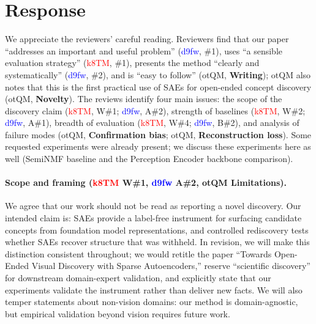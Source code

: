 \documentclass[10pt,twocolumn,letterpaper]{article}
\newcommand{\kTM}{\textcolor{red}{k8TM}}
\newcommand{\dfw}{\textcolor{blue}{d9fw}}
\newcommand{\otQM}{\textcolor{reviewgreen}{otQM}}
\begin{document}
\thispagestyle{empty}
\appendix


\section*{Response}

We appreciate the reviewers' careful reading.
Reviewers find that our paper ``addresses an important and useful problem'' (\dfw{}, \#1), uses ``a sensible evaluation strategy'' (\kTM{}, \#1), presents the method ``clearly and systematically'' (\dfw{}, \#2), and is ``easy to follow'' (\otQM{}, \textbf{Writing}); \otQM{} also notes that this is the first practical use of SAEs for open-ended concept discovery (\otQM{}, \textbf{Novelty}).
The reviews identify four main issues: the scope of the discovery claim (\kTM{}, W\#1; \dfw{}, A\#2), strength of baselines (\kTM{}, W\#2; \dfw{}, A\#1), breadth of evaluation (\kTM{}, W\#4; \dfw{}, B\#2), and analysis of failure modes (\otQM{}, \textbf{Confirmation bias}; \otQM{}, \textbf{Reconstruction loss}).
Some requested experiments were already present; we discuss these experiments here as well (SemiNMF baseline and the Perception Encoder backbone comparison).

\paragraph{Scope and framing (\kTM{} W\#1, \dfw{} A\#2, \otQM{} \textbf{Limitations}).}
We agree that our work should not be read as reporting a novel discovery.
Our intended claim is: SAEs provide a label-free instrument for surfacing candidate concepts from foundation model representations, and controlled rediscovery tests whether SAEs recover structure that was withheld.
In revision, we will make this distinction consistent throughout; we would retitle the paper ``Towards Open-Ended Visual Discovery with Sparse Autoencoders,'' reserve ``scientific discovery'' for downstream domain-expert validation, and explicitly state that our experiments validate the instrument rather than deliver new facts.
We will also temper statements about non-vision domains: our method is domain-agnostic, but empirical validation beyond vision requires future work.
\end{document}
